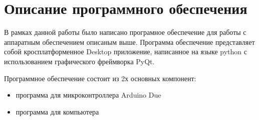 \documentclass[../main.tex]{subfiles}
\begin{document}
\section{Описание программного обеспечения}

В рамках данной работы было написано програмное обеспечение для работы с аппаратным обеспечением описаным выше. Программа обеспечение представляет собой кросплатформенное Desktop приложение, написанное на языке python с использованием графического фреймворка PyQt.

Программное обеспечение состоит из 2х основных компонент:
\begin{itemize}
    \item программа для микроконтроллера Arduino Due
    \item программа для компьютера
\end{itemize}
\newpage
\end{document}
